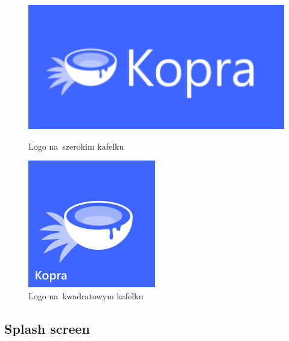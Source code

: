 \documentclass[a4paper,twoside,titlepage,openright]{book}
\begin{document}
\begin{figure}[h]
	\centering
	\begin{minipage}[b]{0.3\textwidth}
		\includegraphics[width=\textwidth]{kafelekSzeroki.png}
		\caption{Logo na~szerokim kafelku}
	\end{minipage}
\hspace*{60px}
	\begin{minipage}[b]{0.3\textwidth}
		\includegraphics[width=\textwidth]{kafelekKwadratowy.png}
		\caption{Logo na~kwadratowym kafelku}
	\end{minipage}
	\hfill
\end{figure}


\subsection{Splash screen}
\end{document}
